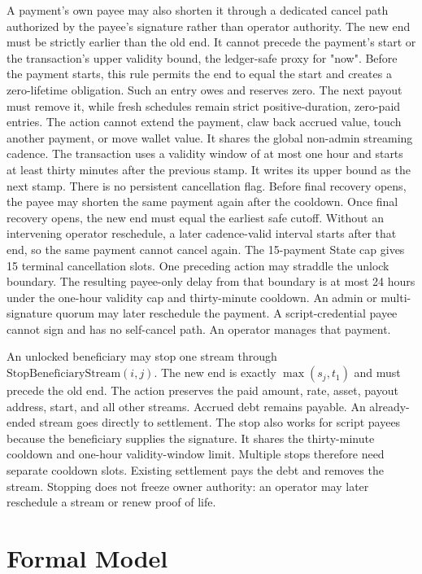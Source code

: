 \documentclass[11pt,DIV=11,parskip=half-]{scrartcl}
\begin{document}
A payment's own payee may also shorten it through a dedicated cancel path authorized by the payee's signature rather than operator authority. The new end must be strictly earlier than the old end. It cannot precede the payment's start or the transaction's upper validity bound, the ledger-safe proxy for "now". Before the payment starts, this rule permits the end to equal the start and creates a zero-lifetime obligation. Such an entry owes and reserves zero. The next payout must remove it, while fresh schedules remain strict positive-duration, zero-paid entries. The action cannot extend the payment, claw back accrued value, touch another payment, or move wallet value. It shares the global non-admin streaming cadence. The transaction uses a validity window of at most one hour and starts at least thirty minutes after the previous stamp. It writes its upper bound as the next stamp. There is no persistent cancellation flag. Before final recovery opens, the payee may shorten the same payment again after the cooldown. Once final recovery opens, the new end must equal the earliest safe cutoff. Without an intervening operator reschedule, a later cadence-valid interval starts after that end, so the same payment cannot cancel again. The 15-payment State cap gives 15 terminal cancellation slots. One preceding action may straddle the unlock boundary. The resulting payee-only delay from that boundary is at most 24 hours under the one-hour validity cap and thirty-minute cooldown. An admin or multi-signature quorum may later reschedule the payment. A script-credential payee cannot sign and has no self-cancel path. An operator manages that payment.

An unlocked beneficiary may stop one stream through $\mathrm{StopBeneficiaryStream}(i,j)$. The new end is exactly $\max(s_j,t_1)$ and must precede the old end. The action preserves the paid amount, rate, asset, payout address, start, and all other streams. Accrued debt remains payable. An already-ended stream goes directly to settlement. The stop also works for script payees because the beneficiary supplies the signature. It shares the thirty-minute cooldown and one-hour validity-window limit. Multiple stops therefore need separate cooldown slots. Existing settlement pays the debt and removes the stream. Stopping does not freeze owner authority: an operator may later reschedule a stream or renew proof of life.

\section{Formal Model}
\label{sec:formal}
\end{document}
